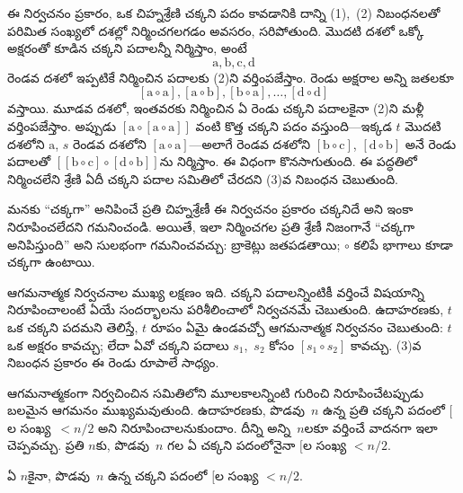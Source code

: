 \documentclass[../../../include/open-logic-section]{subfiles}
\begin{document}
ఈ నిర్వచనం ప్రకారం, ఒక చిహ్నశ్రేణి చక్కని పదం కావడానికి దాన్ని (1),~(2) నిబంధనలతో పరిమిత సంఖ్యలో దశల్లో నిర్మించగలగడం అవసరం, సరిపోతుంది. మొదటి దశలో ఒక్కో అక్షరంతో కూడిన చక్కని పదాలన్నీ నిర్మిస్తాం, అంటే
\[
\mathrm{a}, \mathrm{b}, \mathrm{c}, \mathrm{d}
\]
రెండవ దశలో ఇప్పటికే నిర్మించిన పదాలకు (2)ని వర్తింపజేస్తాం. రెండు అక్షరాల అన్ని జతలకూ
\[
[\mathrm{a} \circ \mathrm{a}], [\mathrm{a} \circ \mathrm{b}],
[\mathrm{b} \circ \mathrm{a}], \dots, [\mathrm{d} \circ \mathrm{d}]
\]
వస్తాయి. మూడవ దశలో, ఇంతవరకు నిర్మించిన ఏ రెండు చక్కని పదాలకైనా (2)ని మళ్లీ వర్తింపజేస్తాం. అప్పుడు $[\mathrm{a} \circ [\mathrm{a} \circ
    \mathrm{a}]]$ వంటి కొత్త చక్కని పదం వస్తుంది---ఇక్కడ $t$ మొదటి దశలోని $\mathrm{a}$, $s$ రెండవ దశలోని $[\mathrm{a} \circ \mathrm{a}]$---అలాగే రెండవ దశలోని $[\mathrm{b} \circ \mathrm{c}]$, $[\mathrm{d}
  \circ \mathrm{b}]$ అనే రెండు పదాలతో $[[\mathrm{b} \circ
    \mathrm{c}] \circ [\mathrm{d} \circ \mathrm{b}]]$ను నిర్మిస్తాం. ఈ విధంగా కొనసాగుతుంది. ఈ పద్ధతిలో నిర్మించలేని శ్రేణి ఏదీ చక్కని పదాల సమితిలో చేరదని (3)వ నిబంధన చెబుతుంది.

మనకు ``చక్కగా'' అనిపించే ప్రతి చిహ్నశ్రేణీ ఈ నిర్వచనం ప్రకారం చక్కనిదే అని ఇంకా నిరూపించలేదని గమనించండి. అయితే, ఇలా నిర్మించగల ప్రతి శ్రేణీ నిజంగానే ``చక్కగా అనిపిస్తుంది'' అని సులభంగా గమనించవచ్చు: బ్రాకెట్లు జతపడతాయి; $\circ$ కలిపే భాగాలు కూడా చక్కగా ఉంటాయి.

ఆగమనాత్మక నిర్వచనాల ముఖ్య లక్షణం ఇది. చక్కని పదాలన్నింటికీ వర్తించే విషయాన్ని నిరూపించాలంటే ఏయే సందర్భాలను పరిశీలించాలో నిర్వచనమే చెబుతుంది. ఉదాహరణకు, $t$ ఒక చక్కని పదమని తెలిస్తే, $t$ రూపం ఏమై ఉండవచ్చో ఆగమనాత్మక నిర్వచనం చెబుతుంది: $t$ ఒక అక్షరం కావచ్చు; లేదా ఏవో చక్కని పదాలు $s_1$,~$s_2$ కోసం $[s_1 \circ s_2]$ కావచ్చు. (3)వ నిబంధన ప్రకారం ఈ రెండు రూపాలే సాధ్యం.

ఆగమనాత్మకంగా నిర్వచించిన సమితిలోని మూలకాలన్నింటి గురించి నిరూపించేటప్పుడు బలమైన ఆగమనం ముఖ్యమవుతుంది. ఉదాహరణకు, పొడవు~$n$ ఉన్న ప్రతి చక్కని పదంలో $[$ల సంఖ్య~$< n/2$ అని నిరూపించాలనుకుందాం. దీన్ని అన్ని~$n$లకూ వర్తించే వాదనగా ఇలా చెప్పవచ్చు. ప్రతి $n$కు, పొడవు~$n$ గల ఏ చక్కని పదంలోనైనా $[$ల సంఖ్య $< n/2$.

\begin{prop}
  ఏ $n$కైనా, పొడవు~$n$ ఉన్న చక్కని పదంలో $[$ల సంఖ్య
  $< n/2$.
\end{prop}
\end{document}
